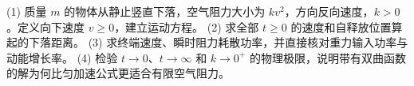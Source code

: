 (1) 质量 \(m\) 的物体从静止竖直下落，空气阻力大小为 \(kv^2\)，方向反向速度，\(k>0\)。定义向下速度 \(v\ge0\)，建立运动方程。
(2) 求全部 \(t\ge0\) 的速度和自释放位置算起的下落距离。
(3) 求终端速度、瞬时阻力耗散功率，并直接核对重力输入功率与动能增长率。
(4) 检验 \(t\to0\)、\(t\to\infty\) 和 \(k\to0^+\) 的物理极限，说明带有双曲函数的解为何比匀加速公式更适合有限空气阻力。
